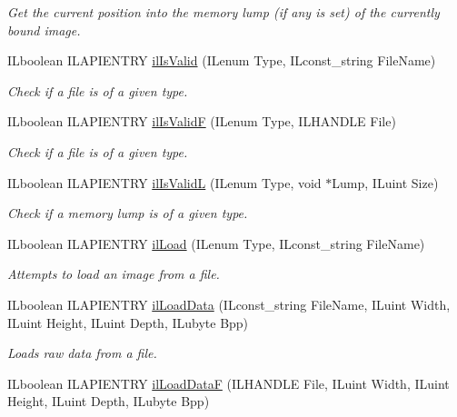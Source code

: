 \begin{DoxyCompactItemize}
\begin{DoxyCompactList}\small\item\em Get the current position into the memory lump (if any is set) of the currently bound image. \end{DoxyCompactList}\item 
I\-Lboolean I\-L\-A\-P\-I\-E\-N\-T\-R\-Y \hyperlink{group__file_ga41b3e8904b94c4b4956a99cdaeda99ae}{il\-Is\-Valid} (I\-Lenum Type, I\-Lconst\-\_\-string File\-Name)
\begin{DoxyCompactList}\small\item\em Check if a file is of a given type. \end{DoxyCompactList}\item 
I\-Lboolean I\-L\-A\-P\-I\-E\-N\-T\-R\-Y \hyperlink{group__file_ga758c5fd4ff61cd47530442cfac50f4c3}{il\-Is\-Valid\-F} (I\-Lenum Type, I\-L\-H\-A\-N\-D\-L\-E File)
\begin{DoxyCompactList}\small\item\em Check if a file is of a given type. \end{DoxyCompactList}\item 
I\-Lboolean I\-L\-A\-P\-I\-E\-N\-T\-R\-Y \hyperlink{group__file_ga6ab6e9cdafb45c65570c5ed5eb0fde57}{il\-Is\-Valid\-L} (I\-Lenum Type, void $\ast$Lump, I\-Luint Size)
\begin{DoxyCompactList}\small\item\em Check if a memory lump is of a given type. \end{DoxyCompactList}\item 
I\-Lboolean I\-L\-A\-P\-I\-E\-N\-T\-R\-Y \hyperlink{group__file_ga9972544062275b0cf8f41acef375d88f}{il\-Load} (I\-Lenum Type, I\-Lconst\-\_\-string File\-Name)
\begin{DoxyCompactList}\small\item\em Attempts to load an image from a file. \end{DoxyCompactList}\item 
\hypertarget{group__file_gaf39ed11daf8c151dff75be87afacdfca}{I\-Lboolean I\-L\-A\-P\-I\-E\-N\-T\-R\-Y \hyperlink{group__file_gaf39ed11daf8c151dff75be87afacdfca}{il\-Load\-Data} (I\-Lconst\-\_\-string File\-Name, I\-Luint Width, I\-Luint Height, I\-Luint Depth, I\-Lubyte Bpp)}\label{group__file_gaf39ed11daf8c151dff75be87afacdfca}

\begin{DoxyCompactList}\small\item\em Loads raw data from a file. \end{DoxyCompactList}\item 
\hypertarget{group__file_ga50049c04c459b921cafcdd7b837ac8ee}{I\-Lboolean I\-L\-A\-P\-I\-E\-N\-T\-R\-Y \hyperlink{group__file_ga50049c04c459b921cafcdd7b837ac8ee}{il\-Load\-Data\-F} (I\-L\-H\-A\-N\-D\-L\-E File, I\-Luint Width, I\-Luint Height, I\-Luint Depth, I\-Lubyte Bpp)}\label{group__file_ga50049c04c459b921cafcdd7b837ac8ee}


\end{DoxyCompactItemize}
